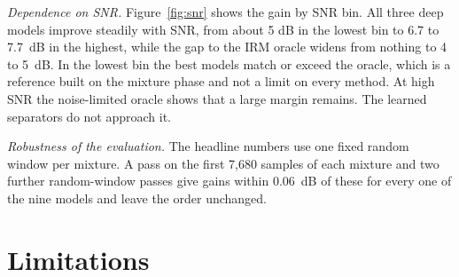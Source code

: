 \documentclass[conference]{IEEEtran}
\begin{document}
\textit{Dependence on SNR.} Figure~\ref{fig:snr} shows the gain by SNR bin. All three deep models improve steadily with SNR, from about 5 dB in the
lowest bin to 6.7 to 7.7~dB in the highest, while the gap to the IRM oracle widens from nothing to 4 to 5~dB. In the lowest bin the best models match or exceed the
oracle, which is a reference built on the mixture phase and not a limit on every method. At high SNR the noise-limited oracle shows that
a large margin remains. The learned separators do not approach it.

\textit{Robustness of the evaluation.} The headline numbers use one fixed random window per mixture. A pass on the first 7,680 samples of each mixture and
two further random-window passes give gains within 0.06~dB of these for every one of the nine models and leave the order unchanged.

\section{Limitations}
\label{sec:limits}
\end{document}
